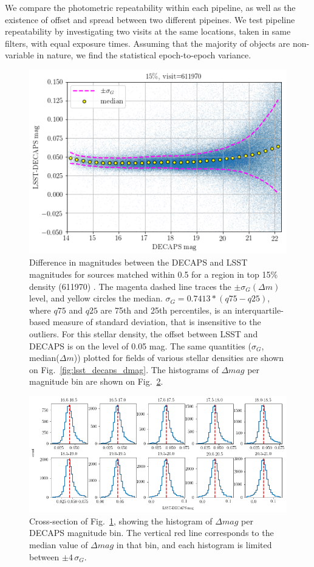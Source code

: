 \documentclass[DM,lsstdraft,toc,usenatbib]{lsstdoc}
\begin{document}
We compare the photometric repeatability within each pipeline, as well as the existence of offset and spread between two different pipeines. We test pipeline repeatability by investigating two visits at the same locations,  taken in same filters, with equal exposure times.  Assuming that the majority of objects are non-variable in nature, we find the statistical epoch-to-epoch variance. 

\begin{figure}
\begin{centering}
\includegraphics[width=0.6\columnwidth]{figs/15_decaps_lsst_dmag_density_15.png}
\caption{Difference in magnitudes between the DECAPS and LSST magnitudes for sources matched within 0.5 \arcsec for a region in top 15\% density (611970) . The magenta dashed line traces the $\pm \sigma_{G}(\Delta m)$ level, and yellow circles the median.  $\sigma_{G} = 0.7413 * (q75 - q25)$, where $q75$ and $q25$ are 75th and 25th percentiles, is an interquartile-based measure of standard deviation, that is insensitive to the outliers. For this stellar density, the offset between LSST and DECAPS is on the level of 0.05 mag. The same quantities ($\sigma_{G}$, median($\Delta m$)) plotted for fields of various stellar densities are shown on Fig.~\ref{fig:lsst_decaps_dmag}. The histograms of $\Delta mag$ per magnitude bin are shown on Fig.~\ref{fig:dmag_hist}.}
\label{fig:dmag_scatter}
\end{centering}
\end{figure} 


\begin{figure}
\includegraphics[width=1.0\columnwidth]{figs/16_rms_decaps_lsst_611970hist_panel.png}
\caption{Cross-section of Fig.~\ref{fig:dmag_scatter}, showing the histogram of $\Delta mag$ per DECAPS magnitude bin. The vertical red line corresponds to the median value of $\Delta mag$ in that bin, and each histogram is limited between $\pm 4 \, \sigma_{G}$. }
\label{fig:dmag_hist}
\end{figure} 
\end{document}
